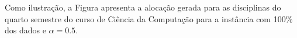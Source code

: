 Como ilustração, a Figura  apresenta a alocação gerada para as disciplinas do quarto semestre do curso de Ciência da Computação para a instância com 100\% dos dados e $\alpha = 0.5$.

\begin{figure}[htbp]
	\centering
\end{figure}
